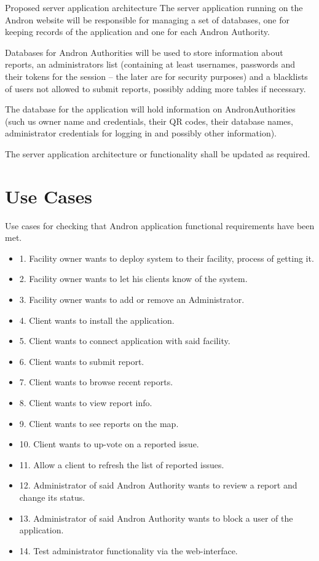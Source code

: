 \documentclass[12pt]{ecsproject}     %
\begin{document}
Proposed server application architecture
The server application running on the Andron website will be responsible for managing a set of databases, one for keeping records of the application and one for each Andron Authority.

Databases for Andron Authorities will be used to store information about reports, an administrators list (containing at least usernames, passwords and their tokens for the session – the later are for security purposes) and a blacklists of users not allowed to submit reports, possibly adding more tables if necessary.

The database for the application will hold information on AndronAuthorities (such us owner name and credentials, their QR codes, their database names, administrator credentials for logging in and possibly other information).

The server application architecture or functionality shall be updated as required.

\section{Use Cases}
Use cases for checking that Andron application functional requirements have been met.

\begin{itemize}
\item 1. Facility owner wants to deploy system to their facility, process of getting it. 
\item 2. Facility owner wants to let his clients know of the system. 
\item 3. Facility owner wants to add or remove an Administrator. 
\item 4. Client wants to install the application. 
\item 5. Client wants to connect application with said facility. 
\item 6. Client wants to submit report. 
\item 7. Client wants to browse recent reports. 
\item 8. Client wants to view report info. 
\item 9. Client wants to see reports on the map. 
\item 10. Client wants to up-vote on a reported issue.
\item 11. Allow a client to refresh the list of reported issues. 
\item 12. Administrator of said Andron Authority wants to review a report and change its status. 
\item 13. Administrator of said Andron Authority wants to block a user of the application. 
\item 14. Test administrator functionality via the web-interface.
\end{itemize}



\end{document}
